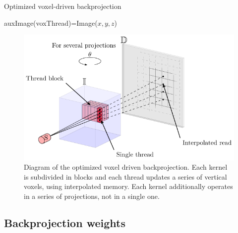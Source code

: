 \begin{algorithm}

\caption{Optimized voxel-driven backprojection
\label{alg:optimizedback}}
\begin{algorithmic}[1]

\State auxImage(voxThread)=Image($x,y,z$)
\EndFor  
{}
\EndFor
\EndFor
{}
\EndFor
\EndKernel{} 
\EndFor

\end{algorithmic}

\end{algorithm}
\begin{figure}
\begin{center}

\includegraphics{GPUmethods/optbackproj-figure0.pdf} 
\end{center}

\caption{\label{fig:optback} Diagram of the optimized voxel driven backprojection. Each kernel is subdivided in blocks and each thread updates a series of vertical voxels, using interpolated memory. Each kernel additionally operates in a series of projections, not in a single one.} 
\end{figure}

\subsection{Backprojection weights}\label{sec:weights}

